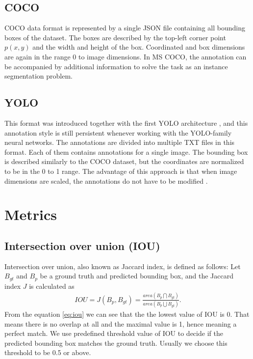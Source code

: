 \subsection{COCO}
COCO data format is represented by a single JSON file containing all bounding boxes of the dataset. The boxes are described by the top-left corner point $p(x,y)$ and the width and height of the box. Coordinated and box dimensions are again in the range 0 to image dimensions. In MS COCO, the annotation can be accompanied by additional information to solve the task as an instance segmentation problem.
\subsection{YOLO}
This format was introduced together with the first YOLO architecture \cite{Redmon2015}, and this annotation style is still persistent whenever working with the YOLO-family neural networks.
The annotations are divided into multiple TXT files in this format. Each of them contains annotations for a single image.
The bounding box is described similarly to the COCO dataset, but the coordinates are normalized to be in the 0 to 1 range. The advantage of this approach is that when image dimensions are scaled, the annotations do not have to be modified \cite{Redmon2015, Padilla2021}.


\section{Metrics}
\subsection{Intersection over union (IOU) }
Intersection over union, also known as Jaccard index, is defined as follows: Let $B_{gt}$ and $B_p$ be a ground truth and predicted bounding box, and the Jaccard index $J$ is calculated as
\begin{align}
    IOU = J(B_p, B_{gt}) = \frac{area(B_p \bigcap B_{gt})}{area(B_p \bigcup B_{gt})}.
    \label{eq:iou}
\end{align}
From the equation \ref{eq:iou} we can see that the the lowest value of IOU is 0. That means there is no overlap at all and the maximal value is 1, hence meaning a perfect match.
We use predefined threshold value of IOU to decide if the predicted bounding box matches the ground truth. Usually we choose this threshold to be 0.5 or above.

